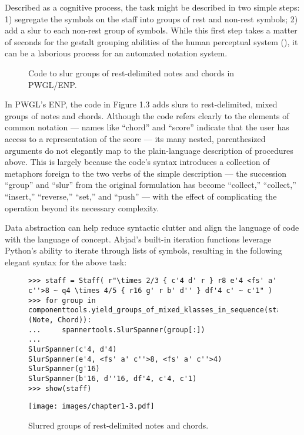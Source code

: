Described as a cognitive process, the task might be described in two simple steps: 1) segregate the symbols on the staff into groups of rest and non-rest symbols; 2) add a slur to each non-rest group of symbols. While this first step takes a matter of seconds for the gestalt grouping abilities of the human perceptual system (\cite{Quinlan:1998ov}), it can be a laborious process for an automated notation system. 

\begin{figure}[h] 
\caption{Code to slur groups of rest-delimited notes and chords in PWGL/ENP.} 
\end{figure}

In PWGL's ENP, the code in Figure 1.3 adds slurs to rest-delimited, mixed groups of notes and chords. Although the code refers clearly to the elements of common notation --- names like ``chord'' and ``score'' indicate that the user has access to a representation of the score --- its many nested, parenthesized arguments do not elegantly map to the plain-language description of procedures above. This is largely because the code's syntax introduces a collection of metaphors foreign to the two verbs of the simple description --- the succession ``group'' and ``slur'' from the original formulation has become ``collect,'' ``collect,'' ``insert,'' ``reverse,'' ``set,'' and ``push'' --- with the effect of complicating the operation beyond its necessary complexity.

Data abstraction can help reduce syntactic clutter and align the language of code with the language of concept. Abjad's built-in iteration functions leverage Python's ability to iterate through lists of symbols, resulting in the following elegant syntax for the above task:

\begin{figure}[h] 
\centering
\begin{lstlisting}[basicstyle=\scriptsize\ttfamily, breaklines=True, tabsize=4, showtabs=false, showspaces=false]
>>> staff = Staff( r"\times 2/3 { c'4 d' r } r8 e'4 <fs' a' c''>8 ~ q4 \times 4/5 { r16 g' r b' d'' } df'4 c' ~ c'1" )
>>> for group in componenttools.yield_groups_of_mixed_klasses_in_sequence(staff.leaves, (Note, Chord)):
...     spannertools.SlurSpanner(group[:])
... 
SlurSpanner(c'4, d'4)
SlurSpanner(e'4, <fs' a' c''>8, <fs' a' c''>4)
SlurSpanner(g'16)
SlurSpanner(b'16, d''16, df'4, c'4, c'1)
>>> show(staff)\end{lstlisting}

\texttt{[image: images/chapter1-3.pdf]}

\caption{Slurred groups of rest-delimited notes and chords.} 
\end{figure}

